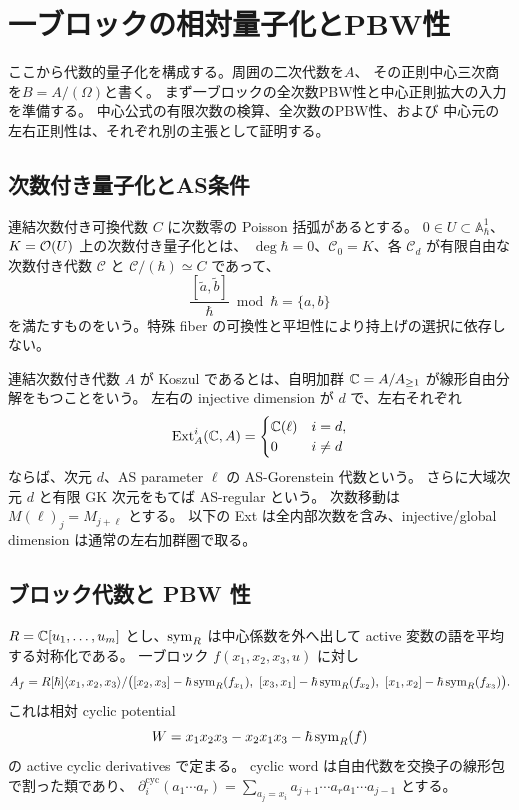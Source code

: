 \section{一ブロックの相対量子化とPBW性}
\label{sec:pg-quantization-foundations}
ここから代数的量子化を構成する。周囲の二次代数を$A$、
その正則中心三次商を$B=A/(\Omega)$と書く。
まず一ブロックの全次数PBW性と中心正則拡大の入力を準備する。
中心公式の有限次数の検算、全次数のPBW性、および
中心元の左右正則性は、それぞれ別の主張として証明する。

\subsection{次数付き量子化とAS条件}

\begin{definition}
連結次数付き可換代数 $C$ に次数零の Poisson 括弧があるとする。
$0\in U\subset\mathbb A^1_\hbar$、$K=\mathcal O(U)$ 上の次数付き量子化とは、
$\deg\hbar=0$、$\mathcal C_0=K$、各 $\mathcal C_d$ が有限自由な
次数付き代数 $\mathcal C$ と $\mathcal C/(\hbar)\simeq C$ であって、
\begin{equation}
\frac{[\widetilde a,\widetilde b]}\hbar\bmod\hbar=\{a,b\}
\end{equation}
を満たすものをいう。特殊 fiber の可換性と平坦性により持上げの選択に依存しない。
\end{definition}
連結次数付き代数 $A$ が Koszul であるとは、自明加群 $\mathbb C=A/A_{\geq1}$ が線形自由分解をもつことをいう。
左右の injective dimension が $d$ で、左右それぞれ
\begin{equation}
\operatorname{Ext}_A^i(\mathbb C,A)=
\begin{cases}\mathbb C(\ell)&i=d,\\0&i\neq d\end{cases}
\end{equation}
ならば、次元 $d$、AS parameter $\ell$ の AS-Gorenstein 代数という。
さらに大域次元 $d$ と有限 GK 次元をもてば AS-regular という。
次数移動は $M(\ell)_j=M_{j+\ell}$ とする。
以下の Ext は全内部次数を含み、injective/global dimension は通常の左右加群圏で取る。

\subsection{ブロック代数と PBW 性}
$R=\mathbb C[u_1,\ldots,u_m]$ とし、$\operatorname{sym}_R$ は中心係数を外へ出して active 変数の語を平均する対称化である。
一ブロック $f(x_1,x_2,x_3,u)$ に対し
\begin{equation}
A_f=R[\hbar]\langle x_1,x_2,x_3\rangle/
\bigl([x_2,x_3]-\hbar\operatorname{sym}_R(f_{x_1}),\ [x_3,x_1]-\hbar\operatorname{sym}_R(f_{x_2}),\
[x_1,x_2]-\hbar\operatorname{sym}_R(f_{x_3})\bigr).\label{eq:pg-block-algebra}
\end{equation}
これは相対 cyclic potential
\begin{equation}
W=x_1x_2x_3-x_2x_1x_3-\hbar\operatorname{sym}_R(f)\label{eq:pg-potential}
\end{equation}
の active cyclic derivatives で定まる。
cyclic word は自由代数を交換子の線形包で割った類であり、
$\partial_i^{\mathrm{cyc}}(a_1\cdots a_r)
=\sum_{a_j=x_i}a_{j+1}\cdots a_ra_1\cdots a_{j-1}$ とする。

